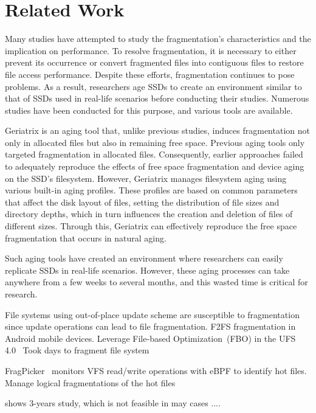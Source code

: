 \section{Related Work}
\label{s:related}

Many studies have attempted to study the fragmentation's characteristics and the implication on performance.
To resolve fragmentation, it is necessary to either prevent its occurrence or convert fragmented files into contiguous files to restore file access performance.
Despite these efforts, fragmentation continues to pose problems.
As a result, researchers age SSDs to create an environment similar to that of SSDs used in real-life scenarios before conducting their studies.
Numerous studies have been conducted for this purpose, and various tools are available.

Geriatrix\cite{geriatrix:atc18} is an aging tool that, unlike previous studies, induces fragmentation not only in allocated files but also in remaining free space.
Previous aging tools only targeted fragmentation in allocated files.
Consequently, earlier approaches failed to adequately reproduce the effects of free space fragmentation and device aging on the SSD's filesystem.
However, Geriatrix manages filesystem aging using various built-in aging profiles. These profiles are based on common parameters that affect the disk layout of files, setting the distribution of file sizes and directory depths, which in turn influences the creation and deletion of files of different sizes. Through this, Geriatrix can effectively reproduce the free space fragmentation that occurs in natural aging.


Such aging tools have created an environment where researchers can easily replicate SSDs in real-life scenarios.
However, these aging processes can take anywhere from a few weeks to several months, and this wasted time is critical for research.


File systems using out-of-place update scheme are susceptible to fragmentation since update operations can lead to file fragmentation.
\cite{f2fs-mobile:nvmsa24} F2FS fragmentation in Android mobile devices.
Leverage File-based Optimization~(FBO) in the UFS 4.0~\cite{ufs4.0}
Took days to fragment file system


FragPicker~\cite{fragpicker:sosp21} monitors VFS read/write operations with eBPF to identify hot files.
Manage logical fragmentations of the hot files


\cite{fs-aging:sigmetrics97} shows 3-years study, which is not feasible in may cases
....
